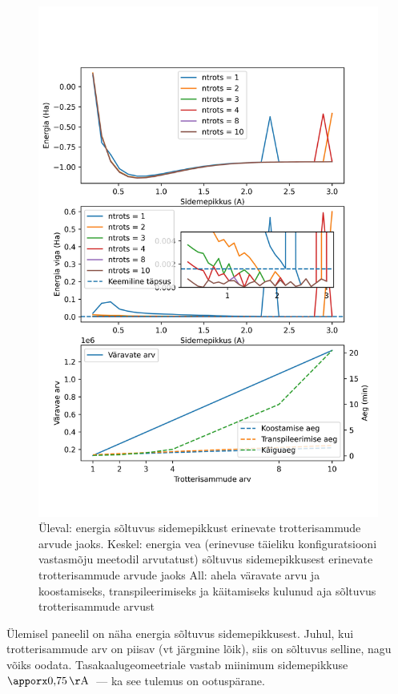 \documentclass[12pt]{report}
\begin{document}
\begin{figure}
  \centering
  \includegraphics[height=.75\vsize]{h2plots.jpg}
  \caption{Üleval: energia sõltuvus sidemepikkust erinevate trotterisammude arvude jaoks.
    Keskel: energia vea (erinevuse täieliku konfiguratsiooni vastasmõju meetodil arvutatust) sõltuvus sidemepikkusest erinevate trotterisammude arvude jaoks
    All: ahela väravate arvu ja koostamiseks, transpileerimiseks ja käitamiseks kulunud aja sõltuvus trotterisammude arvust}
  \label{fig:h2plots}
\end{figure}

Ülemisel paneelil on näha energia sõltuvus sidemepikkusest.
Juhul, kui trotterisammude arv on piisav (vt järgmine lõik), siis on sõltuvus selline, nagu võiks oodata.
Tasakaalugeomeetriale vastab miinimum sidemepikkuse \(\apporx0{,}75\,{\rm Å}\)~--- ka see tulemus on ootuspärane.
\end{document}
